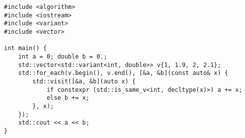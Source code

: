 \begin{lstlisting}[title=\href{https://godbolt.org/z/Dcdmoi}{\texttt{godbolt.org/z/Dcdmoi}}]
#include <algorithm>
#include <iostream>
#include <variant>
#include <vector>

int main() {
    int a = 0; double b = 0.;
    std::vector<std::variant<int, double>> v{1, 1.9, 2, 2.1};
    std::for_each(v.begin(), v.end(), [&a, &b](const auto& x) {
        std::visit([&a, &b](auto x) {
            if constexpr (std::is_same_v<int, decltype(x)>) a += x;
            else b += x;
        }, x);
    });
    std::cout << a << b;
}
\end{lstlisting}
